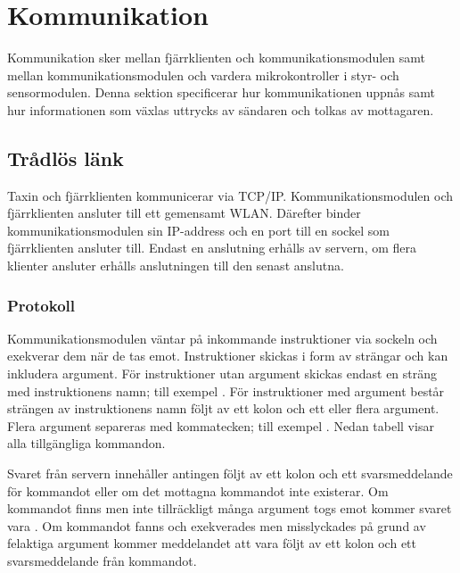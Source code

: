\documentclass[tekniskrapport/tech.tex]{subfiles}
\begin{document}
\section{Kommunikation}
Kommunikation sker mellan fjärrklienten och kommunikationsmodulen samt mellan
kommunikationsmodulen och vardera mikrokontroller i styr- och sensormodulen.
Denna sektion specificerar hur kommunikationen uppnås samt hur informationen
som växlas uttrycks av sändaren och tolkas av mottagaren.

\subsection{Trådlös länk}
Taxin och fjärrklienten kommunicerar via TCP/IP. Kommunikationsmodulen och
fjärrklienten ansluter till ett gemensamt WLAN. Därefter binder
kommunikationsmodulen sin IP-address och en port till en sockel som
fjärrklienten ansluter till. Endast en anslutning erhålls av servern, om flera
klienter ansluter erhålls anslutningen till den senast anslutna.

\subsubsection{Protokoll}
\label{sec:wlproto}
Kommunikationsmodulen väntar på inkommande instruktioner via sockeln och
exekverar dem när de tas emot. Instruktioner skickas i form av strängar och kan
inkludera argument. För instruktioner utan argument skickas endast en sträng
med instruktionens namn; till exempel . För instruktioner med
argument består strängen av instruktionens namn följt av ett kolon och ett
eller flera argument. Flera argument separeras med kommatecken; till exempel
. Nedan tabell visar alla
tillgängliga kommandon.

Svaret från servern innehåller antingen  följt av ett kolon och
ett svarsmeddelande för kommandot eller  om det mottagna
kommandot inte existerar. Om kommandot finns men inte tillräckligt många
argument togs emot kommer svaret vara . Om kommandot fanns
och exekverades men misslyckades på grund av felaktiga argument kommer
meddelandet att vara  följt av ett kolon och ett svarsmeddelande
från kommandot.
\end{document}
